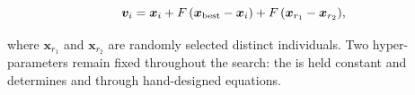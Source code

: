 \begin{equation}
  \bm{v}_{i} = \bm{x}_{i} + F\,(\bm{x}_{\mathrm{best}} - \bm{x}_{i})
             + F\,(\bm{x}_{r_{1}} - \bm{x}_{r_{2}}),
  \label{eq:mutation}
\end{equation}

where $\bm{x}_{r_{1}}$ and $\bm{x}_{r_{2}}$ are randomly selected distinct
individuals. Two hyper-parameters remain fixed throughout the search: the
\CR{} is held constant and determines \Ffactor{} and \GMR{} through
hand-designed equations.

% 
